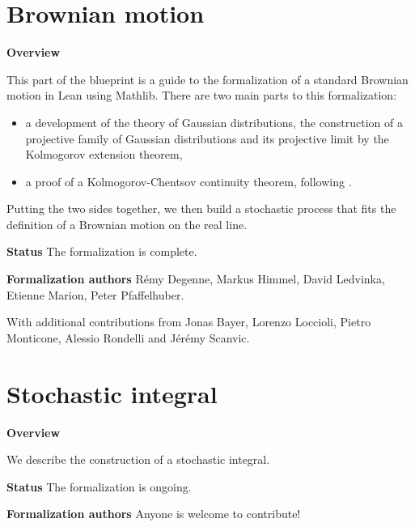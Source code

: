 %

\part{Brownian motion}

\textbf{Overview}

This part of the blueprint is a guide to the formalization of a standard Brownian motion in Lean using Mathlib. There are two main parts to this formalization:
\begin{itemize}
  \item a development of the theory of Gaussian distributions, the construction of a projective family of Gaussian distributions and its projective limit by the Kolmogorov extension theorem,
  \item a proof of a Kolmogorov-Chentsov continuity theorem, following \cite{kratschmer2023kolmogorov}.
\end{itemize}

Putting the two sides together, we then build a stochastic process that fits the definition of a Brownian motion on the real line.

\textbf{Status} The formalization is complete.

\textbf{Formalization authors} Rémy Degenne, Markus Himmel, David Ledvinka, Etienne Marion, Peter Pfaffelhuber.

With additional contributions from Jonas Bayer, Lorenzo Loccioli, Pietro Monticone, Alessio Rondelli and Jérémy Scanvic.








\putbib

\part{Stochastic integral}

\textbf{Overview}

We describe the construction of a stochastic integral.

\textbf{Status} The formalization is ongoing.

\textbf{Formalization authors} Anyone is welcome to contribute!





\putbib
